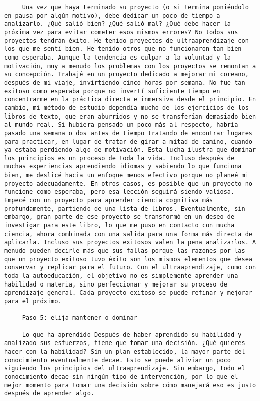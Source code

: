 \begin{verbatim}
	 Una vez que haya terminado su proyecto (o si termina poniéndolo en pausa por algún motivo), debe dedicar un poco de tiempo a analizarlo. ¿Qué salió bien? ¿Qué salió mal? ¿Qué debe hacer la próxima vez para evitar cometer esos mismos errores? No todos sus proyectos tendrán éxito. He tenido proyectos de ultraaprendizaje con los que me sentí bien. He tenido otros que no funcionaron tan bien como esperaba. Aunque la tendencia es culpar a la voluntad y la motivación, muy a menudo los problemas con los proyectos se remontan a su concepción. Trabajé en un proyecto dedicado a mejorar mi coreano, después de mi viaje, invirtiendo cinco horas por semana. No fue tan exitoso como esperaba porque no invertí suficiente tiempo en concentrarme en la práctica directa e inmersiva desde el principio. En cambio, mi método de estudio dependía mucho de los ejercicios de los libros de texto, que eran aburridos y no se transferían demasiado bien al mundo real. Si hubiera pensado un poco más al respecto, habría pasado una semana o dos antes de tiempo tratando de encontrar lugares para practicar, en lugar de tratar de girar a mitad de camino, cuando ya estaba perdiendo algo de motivación. Esta lucha ilustra que dominar los principios es un proceso de toda la vida. Incluso después de muchas experiencias aprendiendo idiomas y sabiendo lo que funciona bien, me deslicé hacia un enfoque menos efectivo porque no planeé mi proyecto adecuadamente. En otros casos, es posible que un proyecto no funcione como esperaba, pero esa lección seguirá siendo valiosa. Empecé con un proyecto para aprender ciencia cognitiva más profundamente, partiendo de una lista de libros. Eventualmente, sin embargo, gran parte de ese proyecto se transformó en un deseo de investigar para este libro, lo que me puso en contacto con mucha ciencia, ahora combinada con una salida para una forma más directa de aplicarla. Incluso sus proyectos exitosos valen la pena analizarlos. A menudo pueden decirle más que sus fallas porque las razones por las que un proyecto exitoso tuvo éxito son los mismos elementos que desea conservar y replicar para el futuro. Con el ultraaprendizaje, como con toda la autoeducación, el objetivo no es simplemente aprender una habilidad o materia, sino perfeccionar y mejorar su proceso de aprendizaje general. Cada proyecto exitoso se puede refinar y mejorar para el próximo.
	 
	 Paso 5: elija mantener o dominar
	 
	 Lo que ha aprendido Después de haber aprendido su habilidad y analizado sus esfuerzos, tiene que tomar una decisión. ¿Qué quieres hacer con la habilidad? Sin un plan establecido, la mayor parte del conocimiento eventualmente decae. Esto se puede aliviar un poco siguiendo los principios del ultraaprendizaje. Sin embargo, todo el conocimiento decae sin ningún tipo de intervención, por lo que el mejor momento para tomar una decisión sobre cómo manejará eso es justo después de aprender algo.
	 

\end{verbatim}
